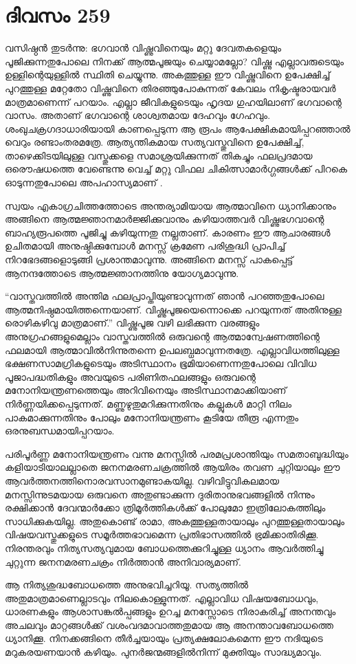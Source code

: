 \section{ദിവസം 259}


വസിഷ്ഠന്‍ തുടര്‍ന്നു: ഭഗവാന്‍ വിഷ്ണുവിനെയും മറ്റു ദേവതകളെയും പൂജിക്കുന്നതുപോലെ നിനക്ക് ആത്മപൂജയും ചെയ്യാമല്ലോ? വിഷ്ണു എല്ലാവരുടെയും ഉള്ളിന്റെയുള്ളില്‍ സ്ഥിതി ചെയ്യുന്നു. അകത്തുള്ള ഈ വിഷ്ണുവിനെ ഉപേക്ഷിച്ച് പുറത്തുള്ള മറ്റേതോ വിഷ്ണുവിനെ തിരഞ്ഞുപോകുന്നത് കേവലം നികൃഷ്ടരായവര്‍ മാത്രമാണെന്ന് പറയാം. എല്ലാ ജീവികളുടെയും ഹൃദയ ഗുഹയിലാണ് ഭഗവാന്റെ വാസം. അതാണ്‌ ഭഗവാന്റെ ശാശ്വതമായ ദേഹവും ഗേഹവും. ശംഖുചക്രഗദാധാരിയായി കാണപ്പെടുന്ന ആ രൂപം ആപേക്ഷികമായിപ്പറഞ്ഞാല്‍ വെറും രണ്ടാംതരമത്രേ. ആത്യന്തികമായ സത്യവസ്തുവിനെ ഉപേക്ഷിച്ച്, താഴെക്കിടയിലുള്ള വസ്തുക്കളെ സമാശ്രയിക്കുന്നത് തികച്ചും ഫലപ്രദമായ ഒരൌഷധത്തെ വേണ്ടെന്നു വെച്ച് മറ്റു വിഫല ചികിത്സാമാര്‍ഗ്ഗങ്ങള്‍ക്ക് പിറകെ ഓടുന്നതുപോലെ അപഹാസ്യമാണ് . 
  
സ്വയം എകാഗ്രചിത്തത്തോടെ അന്തര്യാമിയായ ആത്മാവിനെ ധ്യാനിക്കാനും അങ്ങിനെ ആത്മജ്ഞാനമാര്‍ജ്ജിക്കുവാനും കഴിയാത്തവര്‍ വിഷ്ണുഭഗവാന്റെ ബാഹ്യരൂപത്തെ പൂജിച്ചു കഴിയുന്നതു നല്ലതാണ്. കാരണം ഈ ആചാരങ്ങള്‍ ഉചിതമായി അനുഷ്ഠിക്കുമ്പോള്‍ മനസ്സ് ക്രമേണ പരിശുദ്ധി പ്രാപിച്ച് നിറഭേദങ്ങളൊടുങ്ങി പ്രശാന്തമാവുന്നു. അങ്ങിനെ മനസ്സ് പാകപ്പെട്ട് ആനന്ദത്തോടെ ആത്മജ്ഞാനത്തിനു യോഗ്യമാവുന്നു. 
 
“വാസ്തവത്തില്‍ അന്തിമ ഫലപ്രാപ്തിയുണ്ടാവുന്നത് ഞാന്‍ പറഞ്ഞതുപോലെ  ആത്മനിഷ്ഠമായിത്തന്നെയാണ്. വിഷ്ണുപൂജയെന്നൊക്കെ പറയുന്നത് അതിനുള്ള രൊഴികഴിവു  മാത്രമാണ്.” വിഷ്ണുപൂജ വഴി ലഭിക്കുന്ന വരങ്ങളും അനുഗ്രഹങ്ങളുമെല്ലാം വാസ്തവത്തില്‍ ഒരുവന്റെ ആത്മാന്വേഷണത്തിന്റെ ഫലമായി ആത്മാവില്‍നിന്നുതന്നെ ഉപലബ്ധമാവുന്നതത്രേ. എല്ലാവിധത്തിലുള്ള ഭക്ഷണസാമഗ്രികളുടെയും അടിസ്ഥാനം ഭൂമിയാണെന്നതുപോലെ വിവിധ പൂജാപദ്ധതികളും അവയുടെ പരിണിതഫലങ്ങളും ഒരുവന്റെ മനോനിയന്ത്രണത്തെയും അറിവിനെയും അടിസ്ഥാനമാക്കിയാണ് നിര്‍ണ്ണയിക്കപ്പെടുന്നത്. മണ്ണുഴുതുമറിക്കുന്നതിനും കല്ലുകള്‍ മാറ്റി നിലം പാകമാക്കുന്നതിനും പോലും മനോനിയന്ത്രണം കൂടിയേ തീരൂ എന്നതും ഒരനുബന്ധമായിപ്പറയാം.          

പരിപൂര്‍ണ്ണ മനോനിയന്ത്രണം വന്നു മനസ്സില്‍ പരമപ്രശാന്തിയും സമതാബുദ്ധിയും കളിയാടിയാലല്ലാതെ ജനനമരണചക്രത്തില്‍ ആയിരം തവണ ചുറ്റിയാലും ഈ ആവര്‍ത്തനത്തിനൊരവസാനമുണ്ടാകയില്ല. വഴിവിട്ടുവികലമായ മനസ്സിന്നുടമയായ ഒരുവനെ അതുണ്ടാക്കുന്ന ദുരിതാനുഭവങ്ങളില്‍ നിന്നും രക്ഷിക്കാന്‍ ദേവന്മാര്‍ക്കോ ത്രിമൂര്‍ത്തികള്‍ക്ക് പോലുമോ ഇത്രിലോകത്തിലും സാധിക്കുകയില്ല. അതുകൊണ്ട് രാമാ, അകത്തുള്ളതായാലും പുറത്തുള്ളതായാലും വിഷയവസ്തുക്കളുടെ സമൂര്‍ത്തഭാവമെന്ന പ്രതിഭാസത്തില്‍ ഭ്രമിക്കാതിരിക്കൂ. നിരന്തരവും നിത്യസത്യവുമായ ബോധത്തെക്കുറിച്ചുള്ള ധ്യാനം ആവര്‍ത്തിച്ചു ചുറ്റുന്ന ജനനമരണചക്രം നിര്‍ത്താന്‍ അനിവാര്യമാണ്.  
  
ആ നിത്യശുദ്ധബോധത്തെ അനുഭവിച്ചറിയൂ. സത്യത്തില്‍ അതുമാത്രമാണെല്ലാടവും നിലകൊള്ളുന്നത്. എല്ലാവിധ വിഷയബോധവും, ധാരണകളും ആശാസങ്കല്‍പ്പങ്ങളും ഉറച്ച മനസ്സോടെ നിരാകരിച്ച് അനന്തവും അചലവും മാറ്റങ്ങള്‍ക്ക് വശംവദമാവാത്തതുമായ ആ അനന്താവബോധത്തെ ധ്യാനിക്കൂ. നിനക്കങ്ങിനെ തീര്‍ച്ചയായും പ്രത്യക്ഷലോകമെന്ന ഈ നദിയുടെ മറുകരയണയാന്‍ കഴിയും. പുനര്‍ജന്മങ്ങളില്‍നിന്ന് മുക്തിയും സാദ്ധ്യമാവും.
